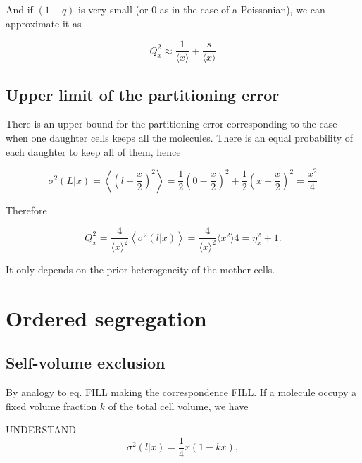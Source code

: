 And if $(1-q)$ is very small (or $0$ as in the case of a Poissonian), we can approximate it as

\begin{equation}
  Q_x^2 \approx \frac{1}{\langle x\rangle} + \frac{s}{\langle x\rangle}
\end{equation}

\subsection{Upper limit of the partitioning error}


There is an upper bound for the partitioning error corresponding to the case when one daughter cells keeps all the molecules. There is an equal probability of each daughter to keep all of them, hence

\begin{equation}
  \sigma^2(L|x) = \left\langle\left(l-\frac{x}{2}\right)^2\right\rangle = \frac{1}{2}\left(0-\frac{x}{2}\right)^2+\frac{1}{2}\left(x-\frac{x}{2}\right)^2 = \frac{x^2}{4}
\end{equation}

Therefore

\begin{equation}
  Q_x^2 = \frac{4}{\langle x\rangle^2}\left\langle\sigma^2(l|x)\right\rangle = \frac{4}{\langle x\rangle^2}{\langle x^2\rangle}{4} = \eta_x^2+1.
\end{equation}

It only depends on the prior heterogeneity of the mother cells.

\section{Ordered segregation}

\subsection{Self-volume exclusion}

By analogy to eq. FILL making the correspondence FILL. If a molecule occupy a fixed volume fraction $k$ of the total cell volume, we have

UNDERSTAND
\begin{equation}
  \sigma^2(l|x) = \frac{1}{4}x(1-kx),
\end{equation}

